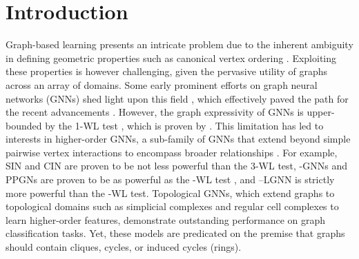 \documentclass[letterpaper]{article} \usepackage{aaai24}  \usepackage{times}  \usepackage{helvet}  \usepackage{courier}  \usepackage[hyphens]{url}  \usepackage{graphicx} \urlstyle{rm} \def\UrlFont{\rm}  \usepackage{natbib}  \usepackage{caption} \frenchspacing  \setlength{\pdfpagewidth}{8.5in} \setlength{\pdfpageheight}{11in} \usepackage{algorithm}
\begin{document}
\section{Introduction} \label{section:intro}
Graph-based learning presents an intricate problem due to the inherent ambiguity in defining geometric properties such as canonical vertex ordering \cite{bouritsas_improving_2021}. Exploiting these properties is however challenging, given the pervasive utility of graphs across an array of domains. Some early prominent efforts on graph neural networks (GNNs) shed light upon this field \cite{bruna_spectral_2014, defferrard_convolutional_2016, kipf_semi-supervised_2017}, which effectively paved the path for the recent advancements \cite{xu_representation_2018, xu_how_2019, velickovic_graph_2018}. However, the graph expressivity of GNNs is upper-bounded by the 1-WL test \cite{weisfeiler_reduction_1968}, which is proven by \cite{xu_how_2019, morris_weisfeiler_2019}. This limitation has led to interests in higher-order GNNs, a sub-family of GNNs that extend beyond simple pairwise vertex interactions to encompass broader relationships \cite{huang_unignn_2021, feng_hypergraph_2018, yadati_hypergcn_2019, bodnar_weisfeiler_2021, bodnar_weisfeiler_2022, ebli_simplicial_2020, roddenberry_principled_2021, giusti_cell_2022, giusti_cin_2023, hajij_topological_2023, papillon_architectures_2023}. For example, SIN\cite{bodnar_weisfeiler_2021} and CIN \cite{bodnar_weisfeiler_2022} are proven to be not less powerful than the 3-WL test, -GNNs \cite{morris_weisfeiler_2019} and PPGNs \cite{maron_provably_2019} are proven to be as powerful as the -WL test \cite{grohe_pebble_2012, grohe_descriptive_2017}, and --LGNN \cite{morris_weisfeiler_2020} is strictly more powerful than the -WL test. Topological GNNs, which extend graphs to topological domains such as simplicial complexes \cite{bodnar_weisfeiler_2021, ebli_simplicial_2020, roddenberry_principled_2021, schaub_random_2020} and regular cell complexes \cite{bodnar_weisfeiler_2022, giusti_cell_2022, giusti_cin_2023} to learn higher-order features, demonstrate outstanding performance on graph classification tasks. Yet, these models are predicated on the premise that graphs should contain cliques, cycles, or induced cycles (rings).
\end{document}
